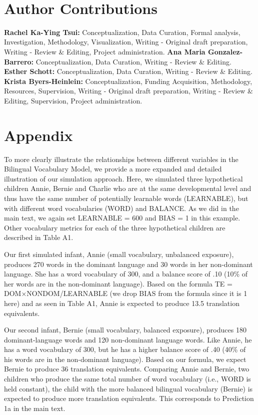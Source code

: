 \documentclass[
  english,
  ,man,floatsintext]{apa6}
\begin{document}
~
~

\hypertarget{author-contributions}{%
\section{Author Contributions}\label{author-contributions}}

\noindent \textbf{Rachel Ka-Ying Tsui:} Conceptualization, Data Curation, Formal analysis, Investigation, Methodology, Visualization, Writing - Original draft preparation, Writing - Review \& Editing, Project administration. \textbf{Ana Maria Gonzalez-Barrero:} Conceptualization, Data Curation, Writing - Review \& Editing. \textbf{Esther Schott:} Conceptualization, Data Curation, Writing - Review \& Editing. \textbf{Krista Byers-Heinlein:} Conceptualization, Funding Acquisition, Methodology, Resources, Supervision, Writing - Original draft preparation, Writing - Review \& Editing, Supervision, Project administration.

\newpage

\hypertarget{appendix}{%
\section{Appendix}\label{appendix}}

To more clearly illustrate the relationships between different variables in the Bilingual Vocabulary Model, we provide a more expanded and detailed illustration of our simulation approach. Here, we simulated three hypothetical children Annie, Bernie and Charlie who are at the same developmental level and thus have the same number of potentially learnable words (LEARNABLE), but with different word vocabularies (WORD) and BALANCE. As we did in the main text, we again set LEARNABLE = 600 and BIAS = 1 in this example. Other vocabulary metrics for each of the three hypothetical children are described in Table A1.

Our first simulated infant, Annie (small vocabulary, unbalanced exposure), produces 270 words in the dominant language and 30 words in her non-dominant language. She has a word vocabulary of 300, and a balance score of .10 (10\% of her words are in the non-dominant language). Based on the formula TE = DOM×NONDOM/LEARNABLE (we drop BIAS from the formula since it is 1 here) and as seen in Table A1, Annie is expected to produce 13.5 translation equivalents.

Our second infant, Bernie (small vocabulary, balanced exposure), produces 180 dominant-language words and 120 non-dominant language words. Like Annie, he has a word vocabulary of 300, but he has a higher balance score of .40 (40\% of his words are in the non-dominant language). Based on our formula, we expect Bernie to produce 36 translation equivalents. Comparing Annie and Bernie, two children who produce the same total number of word vocabulary (i.e., WORD is held constant), the child with the more balanced bilingual vocabulary (Bernie) is expected to produce more translation equivalents. This corresponds to Prediction 1a in the main text.
\end{document}

